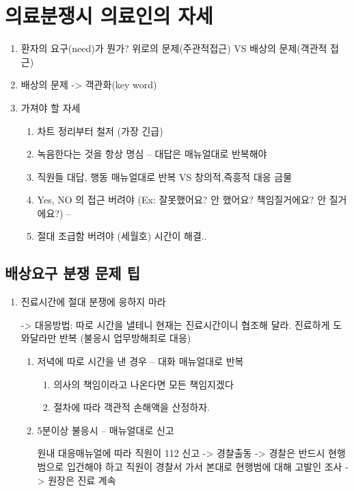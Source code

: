 ﻿\section{의료분쟁시 의료인의 자세}
\begin{enumerate}\tightlist
\item 환자의 요구(need)가 뭔가?
  위로의 문제(주관적접근) VS 배상의 문제(객관적 접근)  
\item 배상의 문제 -> 객관화(key word)
\item 가져야 할 자세
	\begin{mdframed}[linecolor=red,middlelinewidth=2]
	\begin{enumerate}[1)]\tightlist
	\item 차트 정리부터  철저 (가장 긴급)
	\item 녹음한다는 것을  항상  명심 – 대답은  매뉴얼대로  반복해야
	\item 직원들 대답, 행동 매뉴얼대로 반복 VS 창의적,즉흥적 대응 금물
	\item Yes, NO 의 접근 버려야 (Ex: 잘못했어요? 안 했어요? 책임질거에요? 안 질거에요?) –
	\item 절대 조급함 버려야 (세월호)  시간이 해결..       
	\end{enumerate}
	\end{mdframed}
\end{enumerate}

\subsection{배상요구 분쟁 문제 팁}
\begin{enumerate}\tightlist
\item 진료시간에 절대 분쟁에 응하지 마라
   \begin{mdframed}[linecolor=blue,middlelinewidth=2]
	-> 대응방법: 따로 시간을 낼테니 현재는 진료시간이니 협조해 달라. 진료하게 도와달라만 반복   (불응시 업무방해죄로 대응) 
   \end{mdframed}	
	\begin{enumerate}[1)]\tightlist
	\item 저녁에 따로 시간을 낸 경우 – 대화 매뉴얼대로 반복
		\begin{enumerate}[①]\tightlist
		\item 의사의 책임이라고 나온다면 모든 책임지겠다   
   		\item 절차에 따라 객관적 손해액을 산정하자.
		\end{enumerate}
	\item 5분이상 불응시 – 매뉴얼대로 신고 
   \begin{mdframed}[linecolor=blue,middlelinewidth=2]
  원내 대응매뉴얼에 따라 직원이 112 신고 -> 경찰출동 -> 경찰은 반드시 현행범으로 입건해야 하고 직원이 경찰서 가서 본대로 현행범에 대해 고발인 조사 -> 원장은 진료
 계속
   \end{mdframed}
	\end{enumerate}
\end{enumerate}

